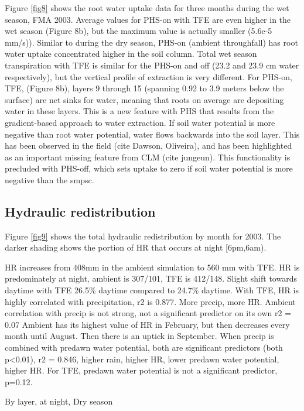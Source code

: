 \documentclass[draft,linenumbers]{agujournal}
\begin{document}
Figure \ref{fig8} shows the root water uptake data for three months during the wet season, FMA 2003. 
Average values for PHS-on with TFE are even higher in the wet season (Figure 8b), but the maximum value is actually smaller (5.6e-5 mm/s)).
Similar to during the dry season, PHS-on (ambient throughfall) has root water uptake concentrated higher in the soil column.
Total wet season transpiration with TFE is similar for the PHS-on and off (23.2 and 23.9 cm water respectively), 
but the vertical profile of extraction is very different.
For PHS-on, TFE, (Figure 8b), layers 9 through 15 (spanning 0.92 to 3.9 meters below the surface) are net sinks for water,
meaning that roots on average are depositing water in these layers.
This is a new feature with PHS that results from the gradient-based approach to water extraction. 
If soil water potential is more negative than root water potential, water flows backwards into the soil layer.
This has been observed in the field (cite Dawson, Oliveira), and has been highlighted as an important missing feature from CLM (cite jungeun).
This functionality is precluded with PHS-off, which sets uptake to zero if soil water potential is more negative than the smpsc. 



\subsection{Hydraulic redistribution}

Figure \ref{fig9} shows the total hydraulic redistribution by month for 2003.
The darker shading shows the portion of HR that occurs at night [6pm,6am). 

HR increases from 408mm in the ambient simulation to 560 mm with TFE.
HR is predominately at night, ambient is 307/101, TFE is 412/148. 
Slight shift towards daytime with TFE 26.5\% daytime compared to 24.7\% daytime.
With TFE, HR is highly correlated with precipitation, r2 is 0.877. More precip, more HR.
Ambient correlation with precip is not strong, not a significant predictor on its own r2 = 0.07
Ambient has its highest value of HR in February, but then decreases every month until August.
Then there is an uptick in September. 
When precip is combined with predawn water potential, both are significant predictors (both p<0.01), r2 = 0.846,
higher rain, higher HR, lower predawn water potential, higher HR.
For TFE, predawn water potential is not a significant predictor, p=0.12.

By layer, at night, Dry season
\end{document}
